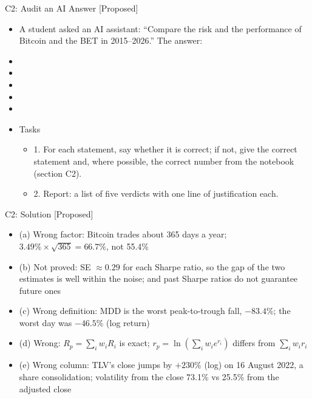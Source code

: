 \begin{frame}{C2: Audit an AI Answer [Proposed]}
\itemsize{\scriptsize}
\begin{itemize}
    \item A student asked an AI assistant: ``Compare the risk and the performance of Bitcoin and the BET in 2015--2026.'' The answer:
    \item {}
    \item {}
    \item {}
    \item {}
    \item {}
    \item Tasks
    \begin{itemize}
        \item 1. For each statement, say whether it is correct; if not, give the correct statement and, where possible, the correct number from the notebook (section C2).
        \item 2. Report: a list of five verdicts with one line of justification each.
    \end{itemize}
\end{itemize}
\end{frame}

\ifsolutions
\begin{frame}{C2: Solution [Proposed]}
\itemsize{\footnotesize}
\begin{itemize}
    \item (a) Wrong factor: Bitcoin trades about 365 days a year; $3.49\% \times \sqrt{365} = 66.7\%$, not 55.4\%
    \item (b) Not proved: SE $\approx 0.29$ for each Sharpe ratio, so the gap of the two estimates is well within the noise; and past Sharpe ratios do not guarantee future ones
    \item (c) Wrong definition: MDD is the worst peak-to-trough fall, $-83.4\%$; the worst day was $-46.5\%$ (log return)
    \item (d) Wrong: $R_p = \sum_i w_i R_i$ is exact; $r_p = \ln(\sum_i w_i e^{r_i})$ differs from $\sum_i w_i r_i$
    \item (e) Wrong column: TLV's close jumps by $+230\%$ (log) on 16 August 2022, a share consolidation; volatility from the close 73.1\% vs 25.5\% from the adjusted close
\end{itemize}
\end{frame}
\fi


